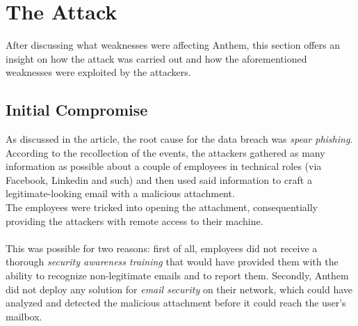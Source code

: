 \section{The Attack}
	After discussing what weaknesses were affecting Anthem, this section offers an insight on how the attack was carried out and how the aforementioned weaknesses were exploited by the attackers. 
	\subsection{Initial Compromise}
	As discussed in the article, the root cause for the data breach was \textit{spear phishing}. According to the recollection of the events, the attackers gathered as many information as possible about a couple of employees in technical roles (via Facebook, Linkedin and such) and then used said information to craft a legitimate-looking email with a malicious attachment. \\
	The employees were tricked into opening the attachment, consequentially providing the attackers with remote access to their machine.\\\\
	This was possible for two reasons: first of all, employees did not receive a thorough \textit{security awareness training} that would have provided them with the ability to recognize non-legitimate emails and to report them. Secondly, Anthem did not deploy any solution for \textit{email security} on their network, which could have analyzed and detected the malicious attachment before it could reach the user's mailbox.

